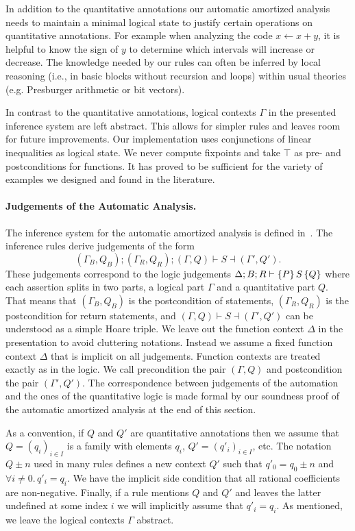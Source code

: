 \documentclass[nocopyrightspace,preprint]{sigplanconf}
\newcommand{\pref}[1]{\prettyref{#1}}
\begin{document}
In addition to the quantitative annotations our automatic amortized
analysis needs to maintain a minimal logical state to justify certain
operations on quantitative annotations.  For example when analyzing
the code $x \gets x + y$, it is helpful to know the sign of $y$ to
determine which intervals will increase or decrease.  The knowledge
needed by our rules can often be inferred by local reasoning (i.e., in
basic blocks without recursion and loops) within usual theories
(e.g. Presburger arithmetic or bit vectors).

In contrast to the quantitative annotations, logical contexts $\Gamma$
in the presented inference system are left abstract.  This allows for
simpler rules and leaves room for future improvements.
%
Our implementation uses conjunctions of linear inequalities as
logical state.  We never compute fixpoints and take $\top$
as pre- and postconditions for functions. It has proved to be
sufficient for the variety of examples we designed and found
in the literature.


\paragraph{Judgements of the Automatic Analysis.}

The inference system for the automatic amortized analysis is defined
in~\pref{fig:auto}.  The inference rules derive judgements of the form
$$
  (\Gamma_B, Q_B); (\Gamma_R, Q_R);
    (\Gamma, Q) \vdash S \dashv (\Gamma', Q').
$$
These judgements correspond to the logic judgements $\Delta; B; R
\vdash \{P\}\, S\, \{Q\}$ where each assertion splits in two parts, a
logical part $\Gamma$ and a quantitative part $Q$.  That means that
$(\Gamma_B, Q_B)$ is the postcondition of  statements,
$(\Gamma_R, Q_R)$ is the postcondition for return statements, and
$(\Gamma, Q) \vdash S \dashv (\Gamma', Q')$ can be understood as a
simple Hoare triple.  We leave out the function context $\Delta$ in
the presentation to avoid cluttering notations.  Instead we assume a
fixed function context $\Delta$ that is implicit on all judgements.
Function contexts are treated exactly as in the logic.  We call
precondition the pair $(\Gamma, Q)$ and postcondition the pair
$(\Gamma', Q')$.  The correspondence between judgements of the
automation and the ones of the quantitative logic is made formal by
our soundness proof of the automatic amortized analysis at the end of
this section.

As a convention, if $Q$ and $Q'$ are quantitative annotations then we
assume that $Q = (q_i)_{i\in I}$ is a family with elements $q_i$, $Q'
= (q'_i)_{i \in I}$, etc.  The notation $Q \pm n$ used in many rules
defines a new context $Q'$ such that $q'_0 = q_0 \pm n$ and $\forall i
\neq 0 .\, q'_i = q_i$.  We have the implicit side condition that all
rational coefficients are non-negative.  Finally, if a rule mentions
$Q$ and $Q'$ and leaves the latter undefined at some index $i$ we will
implicitly assume that $q'_i = q_i$.  As mentioned, we leave the
logical contexts $\Gamma$ abstract.
\end{document}
